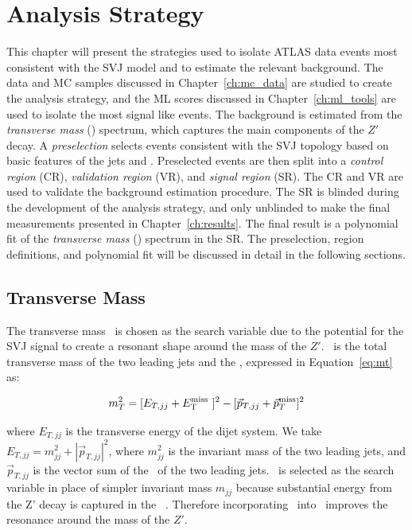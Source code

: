 \chapter{Analysis Strategy}
\label{ch:analysis}

This chapter will present the strategies used to isolate ATLAS data events most consistent with the SVJ model and to estimate the relevant background. The data and MC samples discussed in Chapter~\ref{ch:mc_data} are studied to create the analysis strategy, and the ML scores discussed in Chapter~\ref{ch:ml_tools} are used to isolate the most signal like events. The background is estimated from the \textit{transverse mass} (\mt) spectrum, which captures the main components of the $Z'$ decay. A \textit{preselection} selects events consistent with the SVJ topology based on basic features of the jets and \met. Preselected events are then split into a \textit{control region} (CR), \textit{validation region} (VR), and \textit{signal region} (SR). The CR and VR are used to validate the background estimation procedure. The SR is blinded during the development of the analysis strategy, and only unblinded to make the final measurements presented in Chapter~\ref{ch:results}. The final result is a polynomial fit of the \textit{transverse mass} (\mt) spectrum in the SR. The preselection, region definitions, and polynomial fit will be discussed in detail in the following sections.

\section{Transverse Mass}
\label{sec:mt}
The transverse mass \mt~is chosen as the search variable due to the potential for the SVJ signal to create a resonant shape around the mass of the $Z'$. \mt~is the total transverse mass of the two leading jets and the \met, expressed in Equation~\ref{eq:mt} as:

\begin{equation}
m_T^2 = [E_{T,jj} + E_{\text{T}}^{\text{miss}}~]^2 - [\vec{p}_{T,jj} + \vec{p}_T^{\text{miss}}]^2
\label{eq:mt}
\end{equation}

where $E_{T,jj}$ is the transverse energy of the dijet system. We take $E_{T,jj} = m_{jj}^2 + |\vec{p}_{T,jj}|^2$, where $m_{jj}^2$ is the invariant mass of the two leading jets, and $\vec{p}_{T,jj}$ is the vector sum of the \pt~of the two leading jets. \mt~is selected as the search variable in place of simpler invariant mass $m_{jj}$ because substantial energy from the Z' decay is captured in the \met~. Therefore incorporating \met~into \mt~improves the resonance around the mass of the $Z'$. \par

